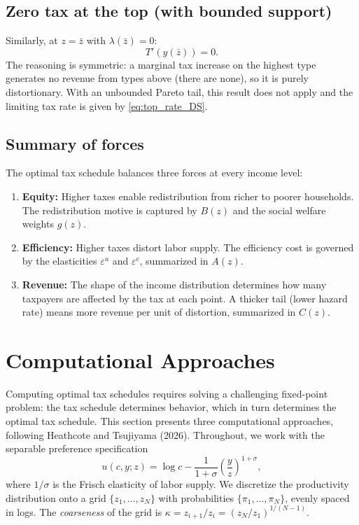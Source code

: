 \documentclass[12pt,a4paper]{article}
\theoremstyle{definition}
\theoremstyle{plain}
\theoremstyle{remark}
\newcommand{\zbar}{\bar{z}}
\begin{document}
\subsection{Zero tax at the top (with bounded support)}

Similarly, at $z = \zbar$ with $\lambda(\zbar) = 0$:
\[
  T'(y(\zbar)) = 0.
\]
The reasoning is symmetric: a marginal tax increase on the highest type generates no revenue from types above (there are none), so it is purely distortionary. With an unbounded Pareto tail, this result does not apply and the limiting tax rate is given by \eqref{eq:top_rate_DS}.

\subsection{Summary of forces}

The optimal tax schedule balances three forces at every income level:
\begin{enumerate}[label=\arabic*., leftmargin=2em]
  \item \textbf{Equity:} Higher taxes enable redistribution from richer to poorer households. The redistribution motive is captured by $B(z)$ and the social welfare weights $g(z)$.

  \item \textbf{Efficiency:} Higher taxes distort labor supply. The efficiency cost is governed by the elasticities $\varepsilon^u$ and $\varepsilon^c$, summarized in $A(z)$.

  \item \textbf{Revenue:} The shape of the income distribution determines how many taxpayers are affected by the tax at each point. A thicker tail (lower hazard rate) means more revenue per unit of distortion, summarized in $C(z)$.
\end{enumerate}

\section{Computational Approaches}
\label{sec:computation}

Computing optimal tax schedules requires solving a challenging fixed-point problem: the tax schedule determines behavior, which in turn determines the optimal tax schedule. This section presents three computational approaches, following Heathcote and Tsujiyama (2026). Throughout, we work with the separable preference specification
\[
  u(c,y;z) = \log c - \frac{1}{1+\sigma}\left(\frac{y}{z}\right)^{1+\sigma},
\]
where $1/\sigma$ is the Frisch elasticity of labor supply. We discretize the productivity distribution onto a grid $\{z_1, \ldots, z_N\}$ with probabilities $\{\pi_1, \ldots, \pi_N\}$, evenly spaced in logs. The \emph{coarseness} of the grid is $\kappa = z_{i+1}/z_i = (z_N/z_1)^{1/(N-1)}$.
\end{document}
